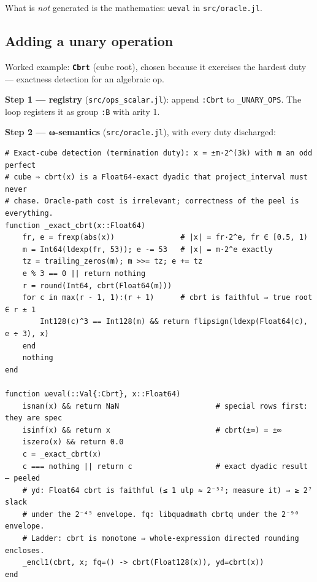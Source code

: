 What is \emph{not} generated is the mathematics: \texttt{ωeval} in \texttt{src/oracle.jl}.



\subsection{Adding a unary operation}



\label{8519510493258928519}{}


Worked example: \textbf{\texttt{Cbrt}} (cube root), chosen because it exercises the hardest duty — exactness detection for an algebraic op.



\textbf{Step 1 — registry} (\texttt{src/ops\_scalar.jl}): append \texttt{:Cbrt} to \texttt{\_UNARY\_OPS}. The loop registers it as group \texttt{:B} with arity 1.



\textbf{Step 2 — ω-semantics} (\texttt{src/oracle.jl}), with every duty discharged:




\begin{verbatim}
# Exact-cube detection (termination duty): x = ±m·2^(3k) with m an odd perfect
# cube ⇒ cbrt(x) is a Float64-exact dyadic that project_interval must never
# chase. Oracle-path cost is irrelevant; correctness of the peel is everything.
function _exact_cbrt(x::Float64)
    fr, e = frexp(abs(x))               # |x| = fr·2^e, fr ∈ [0.5, 1)
    m = Int64(ldexp(fr, 53)); e -= 53   # |x| = m·2^e exactly
    tz = trailing_zeros(m); m >>= tz; e += tz
    e % 3 == 0 || return nothing
    r = round(Int64, cbrt(Float64(m)))
    for c in max(r - 1, 1):(r + 1)      # cbrt is faithful ⇒ true root ∈ r ± 1
        Int128(c)^3 == Int128(m) && return flipsign(ldexp(Float64(c), e ÷ 3), x)
    end
    nothing
end

function ωeval(::Val{:Cbrt}, x::Float64)
    isnan(x) && return NaN                      # special rows first: they are spec
    isinf(x) && return x                        # cbrt(±∞) = ±∞
    iszero(x) && return 0.0
    c = _exact_cbrt(x)
    c === nothing || return c                   # exact dyadic result — peeled
    # yd: Float64 cbrt is faithful (≤ 1 ulp ≈ 2⁻⁵²; measure it) ⇒ ≥ 2⁷ slack
    # under the 2⁻⁴⁵ envelope. fq: libquadmath cbrtq under the 2⁻⁹⁰ envelope.
    # Ladder: cbrt is monotone ⇒ whole-expression directed rounding encloses.
    _encl1(cbrt, x; fq=() -> cbrt(Float128(x)), yd=cbrt(x))
end
\end{verbatim}



